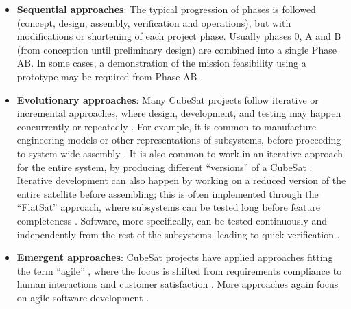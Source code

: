 \documentclass[]{iac}
\begin{document}
    \begin{itemize}
        \item \textbf{Sequential approaches}: The typical progression of phases is followed (concept, design, assembly, verification and operations), but with modifications or shortening of each project phase. Usually phases 0, A and B (from conception until preliminary design) are combined into a single Phase AB. In some cases, a demonstration of the mission feasibility using a prototype may be required from Phase AB \autocite{nieto-peroy_cubesat_2019,lubian-arenillas_nanosatellite_2019,tyvak_trestles_2021}.
        \item \textbf{Evolutionary approaches}: Many CubeSat projects follow iterative or incremental approaches, where design, development, and testing may happen concurrently or repeatedly \autocite{lubian-arenillas_nanosatellite_2019,alanazi_engineering_2019,sousa_cubesat_2021}. For example, it is common to manufacture engineering models or other representations of subsystems, before proceeding to system-wide assembly \autocite{faure_toward_2017}. It is also common to work in an iterative approach for the entire system, by producing different ``versions'' of a CubeSat \autocite{decker_systems-engineering_2016,cappaert_building_2018}. Iterative development can also happen by working on a reduced version of the entire satellite before assembling; this is often implemented through the ``FlatSat'' approach, where subsystems can be tested long before feature completeness \autocite{nasa_cubesat_launch_initiative_cubesat_2017,MAIVP}. Software, more specifically, can be tested continuously and independently from the rest of the subsystems, leading to quick verification \autocite{kiesbye_hardware---loop_2019}.
        
        \item \textbf{Emergent approaches}: CubeSat projects have applied approaches fitting the term ``agile'' \autocite{angeli_paving_2014,labarge_cubesat_2014,lubian-arenillas_nanosatellite_2019}, where the focus is shifted from requirements compliance to human interactions and customer satisfaction \autocite{beck_agile_2001}. More approaches again focus on agile software development \autocite{lill_agile_2018,coyle_eecsat_2020}.

    \end{itemize}

    \label{sec:approaches}

    

    \paragraph{}
\end{document}
